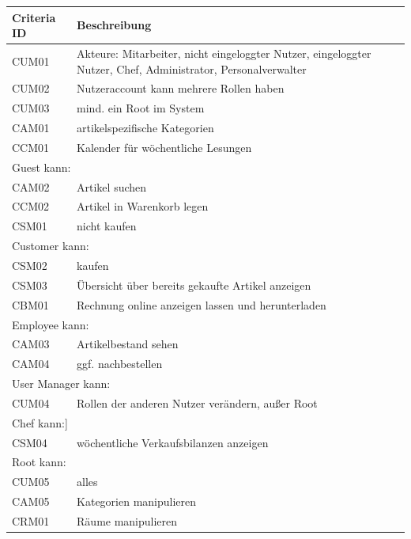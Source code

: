 \documentclass[a4paper]{article}
\begin{document}
\begin{longtable}{|p{100px}|p{250px}|}
	\hline
	\rowcolor[HTML]{C0C0C0}
	Criteria ID & Beschreibung \\ \hline
	CUM01 & Akteure: Mitarbeiter, nicht eingeloggter Nutzer, eingeloggter Nutzer, Chef, Administrator, Personalverwalter \\ \hline
	CUM02 & Nutzeraccount kann mehrere Rollen haben \\ \hline
	CUM03 & mind. ein Root im System  \\ \hline
	CAM01 & artikelspezifische Kategorien  \\ \hline
	CCM01 & Kalender für wöchentliche Lesungen  \\ \hline
	\multicolumn{2}{|l|}{Guest kann:} \\ \hline
	CAM02 & Artikel suchen \\ \hline
	CCM02 & Artikel in Warenkorb legen \\ \hline
	CSM01 & nicht kaufen \\ \hline
	\multicolumn{2}{|l|}{Customer kann:} \\ \hline
	CSM02 & kaufen \\ \hline
	CSM03 & Übersicht über bereits gekaufte Artikel anzeigen \\ \hline
	CBM01 & Rechnung online anzeigen lassen und herunterladen \\ \hline
	\multicolumn{2}{|l|}{Employee kann:} \\ \hline
	CAM03 & Artikelbestand sehen \\ \hline
	CAM04 & ggf. nachbestellen \\ \hline
	\multicolumn{2}{|l|}{User Manager kann:} \\ \hline
	CUM04 & Rollen der anderen Nutzer verändern, außer Root \\ \hline
	\multicolumn{2}{|l|}{Chef kann:]} \\ \hline
	CSM04 & wöchentliche Verkaufsbilanzen anzeigen \\ \hline
	\multicolumn{2}{|l|}{Root kann:} \\ \hline
	CUM05 & alles \\ \hline
	CAM05 & Kategorien manipulieren \\ \hline
	CRM01 & Räume manipulieren \\ \hline
\end{longtable}
\end{document}
